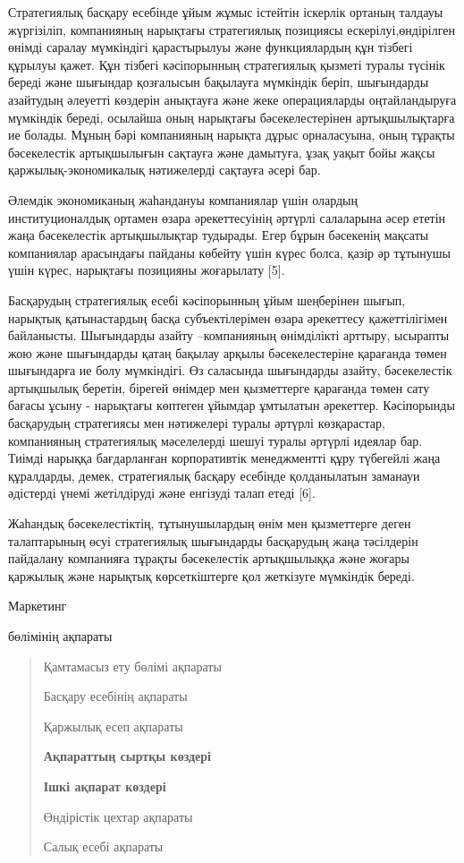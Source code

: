 Стратегиялық басқару есебінде ұйым жұмыс істейтін іскерлік ортаның
талдауы жүргізіліп, компанияның нарықтағы стратегиялық позициясы
ескерілуі,өндірілген өнімді саралау мүмкіндігі қарастырылуы және
функциялардың құн тізбегі құрылуы қажет. Құн тізбегі кәсіпорынның
стратегиялық қызметі туралы түсінік береді және шығындар қозғалысын
бақылауға мүмкіндік беріп, шығындарды азайтудың әлеуетті көздерін
анықтауға және жеке операцияларды оңтайландыруға мүмкіндік береді,
осылайша оның нарықтағы бәсекелестерінен артықшылықтарға ие болады.
Мұның бәрі компанияның нарықта дұрыс орналасуына, оның тұрақты
бәсекелестік артықшылығын сақтауға және дамытуға, ұзақ уақыт бойы жақсы
қаржылық-экономикалық нәтижелерді сақтауға әсері бар.

Әлемдік экономиканың жаһандануы компаниялар үшін олардың
институционалдық ортамен өзара әрекеттесуінің әртүрлі салаларына әсер
ететін жаңа бәсекелестік артықшылықтар тудырады. Егер бұрын бәсекенің
мақсаты компаниялар арасындағы пайданы көбейту үшін күрес болса, қазір
әр тұтынушы үшін күрес, нарықтағы позицияны жоғарылату {[}5{]}.

Басқарудың стратегиялық есебі кәсіпорынның ұйым шеңберінен шығып,
нарықтық қатынастардың басқа субъектілерімен өзара әрекеттесу
қажеттілігімен байланысты. Шығындарды азайту --компанияның өнімділікті
арттыру, ысырапты жою және шығындарды қатаң бақылау арқылы
бәсекелестеріне қарағанда төмен шығындарға ие болу мүмкіндігі. Өз
саласында шығындарды азайту, бәсекелестік артықшылық беретін, бірегей
өнімдер мен қызметтерге қарағанда төмен сату бағасы ұсыну - нарықтағы
көптеген ұйымдар ұмтылатын әрекеттер. Кәсіпорынды басқарудың стратегиясы
мен нәтижелері туралы әртүрлі көзқарастар, компанияның стратегиялық
мәселелерді шешуі туралы әртүрлі идеялар бар. Тиімді нарыққа
бағдарланған корпоративтік менеджментті құру түбегейлі жаңа құралдарды,
демек, стратегиялық басқару есебінде қолданылатын заманауи әдістерді
үнемі жетілдіруді және енгізуді талап етеді {[}6{]}.

Жаһандық бәсекелестіктің, тұтынушылардың өнім мен қызметтерге деген
талаптарының өсуі стратегиялық шығындарды басқарудың жаңа тәсілдерін
пайдалану компанияға тұрақты бәсекелестік артықшылыққа және жоғары
қаржылық және нарықтық көрсеткіштерге қол жеткізуге мүмкіндік береді.

Маркетинг

бөлімінің ақпараты

\begin{quote}
Қамтамасыз ету бөлімі ақпараты

Басқару есебінің ақпараты

Қаржылық есеп ақпараты

{\bfseries Ақпараттың сыртқы көздері}

{\bfseries Ішкі ақпарат көздері}

Өндірістік цехтар ақпараты

Салық есебі ақпараты
\end{quote}

